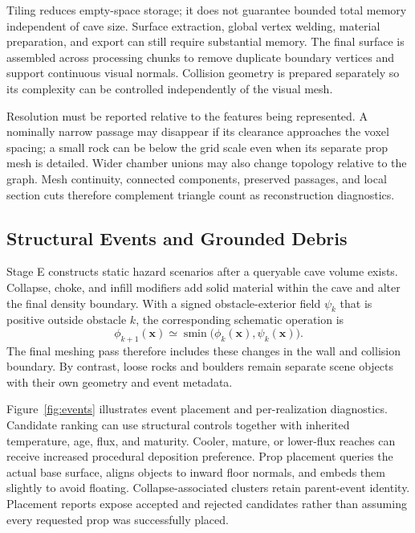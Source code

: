 \documentclass[conference]{IEEEtran}
\begin{document}
Tiling reduces empty-space storage; it does not guarantee bounded total memory independent of cave size. Surface extraction, global vertex welding, material preparation, and export can still require substantial memory. The final surface is assembled across processing chunks to remove duplicate boundary vertices and support continuous visual normals. Collision geometry is prepared separately so its complexity can be controlled independently of the visual mesh.

Resolution must be reported relative to the features being represented. A nominally narrow passage may disappear if its clearance approaches the voxel spacing; a small rock can be below the grid scale even when its separate prop mesh is detailed. Wider chamber unions may also change topology relative to the graph. Mesh continuity, connected components, preserved passages, and local section cuts therefore complement triangle count as reconstruction diagnostics.

\subsection{Structural Events and Grounded Debris}
Stage E constructs static hazard scenarios after a queryable cave volume exists. Collapse, choke, and infill modifiers add solid material within the cave and alter the final density boundary. With a signed obstacle-exterior field $\psi_k$ that is positive outside obstacle $k$, the corresponding schematic operation is
\begin{equation}
\phi_{k+1}(\mathbf{x})\simeq
\operatorname{smin}\bigl(\phi_k(\mathbf{x}),\psi_k(\mathbf{x})\bigr).
\label{eq:events}
\end{equation}
The final meshing pass therefore includes these changes in the wall and collision boundary. By contrast, loose rocks and boulders remain separate scene objects with their own geometry and event metadata.

Figure~\ref{fig:events} illustrates event placement and per-realization diagnostics. Candidate ranking can use structural controls together with inherited temperature, age, flux, and maturity. Cooler, mature, or lower-flux reaches can receive increased procedural deposition preference. Prop placement queries the actual base surface, aligns objects to inward floor normals, and embeds them slightly to avoid floating. Collapse-associated clusters retain parent-event identity. Placement reports expose accepted and rejected candidates rather than assuming every requested prop was successfully placed.
\end{document}
